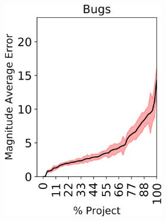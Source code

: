 \begin{figure}[tp!]
	\centering
	\begin{subfigure}[t]{\linewidth}
	\begin{subfigure}[t]{0.33\linewidth}
		\centering
		\includegraphics[width=\linewidth]{images/RQ1/inhouse/Bugs.png}
	\end{subfigure}%
	~
	\centering
		\begin{subfigure}[t]{0.33\linewidth}
		\centering

\end{subfigure}
\end{subfigure}
\end{figure}
